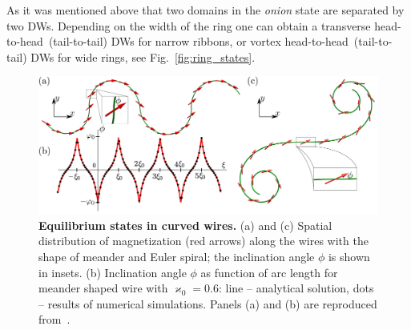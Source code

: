 \documentclass[runningheads]{llncs}
\begin{document}
As it was mentioned above that two domains in the \textit{onion} state are separated by two DWs. Depending on the width of the ring one can obtain a transverse head-to-head~(tail-to-tail) DWs for narrow ribbons, or vortex head-to-head~(tail-to-tail) DWs for wide rings, see Fig.~\ref{fig:ring_states}.

\begin{figure}[t]
	\includegraphics[width=\textwidth]{fig_cornu_n_meander}
	\caption{\label{fig:cornu_n_meander}%
		\textbf{Equilibrium states in curved wires.} (a) and (c) Spatial distribution of magnetization (red arrows) along the wires with the shape of meander and Euler spiral; the inclination angle $\phi$ is shown in insets. (b) Inclination angle $\phi$ as function of arc length for meander shaped wire with $\varkappa_0=0.6$: line -- analytical solution, dots -- results of numerical simulations. Panels (a) and (b) are reproduced from~\cite{Korniienko19b}.}
\end{figure}
\end{document}
